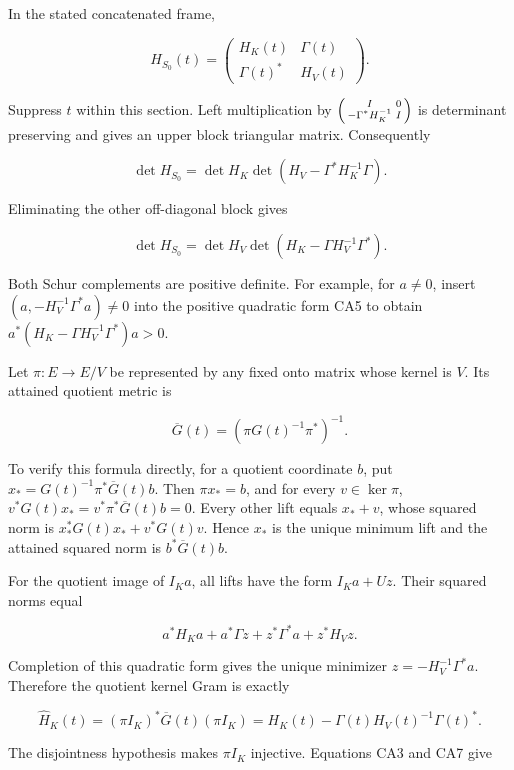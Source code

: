 In the stated concatenated frame,

\[
H_{S_0}(t)=
\begin{pmatrix}H_K(t)&\Gamma(t)\\
\Gamma(t)^*&H_V(t)\end{pmatrix}.
\tag{CA5}
\]

Suppress \(t\) within this section. Left multiplication by \(\begin{psmallmatrix}I&0\\-\Gamma^*H_K^{-1}&I\end{psmallmatrix}\) is determinant preserving and gives an upper block triangular matrix. Consequently

\[
\det H_{S_0}
=\det H_K\det(H_V-\Gamma^*H_K^{-1}\Gamma).
\tag{CA6}
\]

Eliminating the other off-diagonal block gives

\[
\det H_{S_0}
=\det H_V\det(H_K-\Gamma H_V^{-1}\Gamma^*).
\tag{CA7}
\]

Both Schur complements are positive definite. For example, for \(a\ne0\), insert \((a,-H_V^{-1}\Gamma^*a)\ne0\) into the positive quadratic form CA5 to obtain \(a^*(H_K-\Gamma H_V^{-1}\Gamma^*)a>0\).

Let \(\pi:E\to E/V\) be represented by any fixed onto matrix whose kernel is \(V\). Its attained quotient metric is

\[
\overline G(t)=(\pi G(t)^{-1}\pi^*)^{-1}.
\tag{CA8}
\]

To verify this formula directly, for a quotient coordinate \(b\), put \(x_*=G(t)^{-1}\pi^*\overline G(t)b\). Then \(\pi x_*=b\), and for every \(v\in\ker\pi\), \(v^*G(t)x_*=v^*\pi^*\overline G(t)b=0\). Every other lift equals \(x_*+v\), whose squared norm is \(x_*^*G(t)x_*+v^*G(t)v\). Hence \(x_*\) is the unique minimum lift and the attained squared norm is \(b^*\overline G(t)b\).

For the quotient image of \(I_Ka\), all lifts have the form \(I_Ka+Uz\). Their squared norms equal

\[
a^*H_Ka+a^*\Gamma z+z^*\Gamma^*a+z^*H_Vz.
\]

Completion of this quadratic form gives the unique minimizer \(z=-H_V^{-1}\Gamma^*a\). Therefore the quotient kernel Gram is exactly

\[
\widehat H_K(t)
=(\pi I_K)^*\overline G(t)(\pi I_K)
=H_K(t)-\Gamma(t)H_V(t)^{-1}\Gamma(t)^*.
\tag{CA9}
\]

The disjointness hypothesis makes \(\pi I_K\) injective. Equations CA3 and CA7 give

